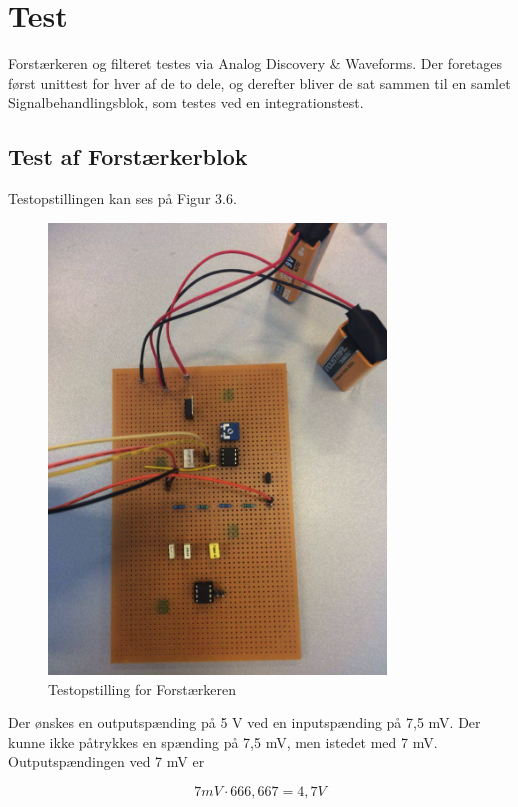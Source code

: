 \section{Test}
Forstærkeren og filteret testes via Analog Discovery \& Waveforms. Der foretages først unittest for hver af de to dele, og derefter bliver de sat sammen til en samlet Signalbehandlingsblok, som testes ved en integrationstest.\\ 

\subsection{Test af Forstærkerblok}
Testopstillingen kan ses på Figur 3.6. 

\begin{figure}[H]
	\centering
	\includegraphics[width=0.8\textwidth]{Figurer/Snip20151207_35}
	\caption{Testopstilling for Forstærkeren}
\end{figure}

Der ønskes en outputspænding på 5 V ved en inputspænding på 7,5 mV. Der kunne ikke påtrykkes en spænding på 7,5 mV, men istedet med 7 mV. Outputspændingen ved 7 mV er 

\begin{equation}
	7 mV \cdot 666,667 = 4,7 V
\end{equation} 

